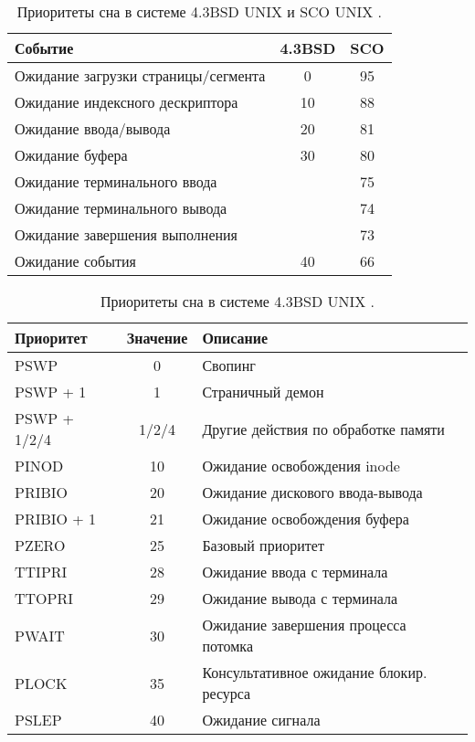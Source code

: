 \begin{table}[h]
	\begin{center}
		\captionsetup{justification=raggedright,singlelinecheck=off}
		\caption{\label{tbl:best2}Приоритеты сна в системе 4.3BSD UNIX и SCO UNIX \cite{unixR}.}
		\begin{tabular}{lcc}
			\hline
			\textbf{Событие} & \textbf{4.3BSD} & \textbf{SCO} \\
                \hline
			Ожидание загрузки страницы/сегмента & 0 & 95 \\
		      Ожидание индексного дескриптора & 10 & 88 \\
                Ожидание ввода/вывода  & 20 & 81 \\
                Ожидание буфера         & 30 & 80 \\
                Ожидание терминального ввода &  & 75 \\
                Ожидание терминального вывода  &  & 74 \\
                Ожидание завершения выполнения &  & 73 \\
                Ожидание события & 40 & 66 \\
			\hline
		\end{tabular}
	\end{center}
\end{table}

\begin{table}[h]
	\begin{center}
		\captionsetup{justification=raggedright,singlelinecheck=off}
		\caption{\label{tbl:best1}Приоритеты сна в системе 4.3BSD UNIX \cite{unix6}.}
		\begin{tabular}{lcl}
			\hline
			\textbf{Приоритет} & \textbf{Значение} & \textbf{Описание} \\
                \hline
			PSWP          & 0     & Свопинг \\
		      PSWP + 1      & 1     & Страничный демон \\
                PSWP + 1/2/4  & 1/2/4 & Другие действия по обработке памяти \\
                PINOD         & 10    & Ожидание освобождения inode \\
                PRIBIO        & 20    & Ожидание дискового ввода-вывода \\
                PRIBIO + 1    & 21    & Ожидание освобождения буфера \\
                PZERO         & 25    & Базовый приоритет \\
                TTIPRI        & 28    & Ожидание ввода с терминала \\
                TTOPRI        & 29    & Ожидание вывода с терминала \\
                PWAIT         & 30    & Ожидание завершения процесса потомка \\
                PLOCK         & 35    & Консультативное ожидание блокир. ресурса \\
                PSLEP         & 40    & Ожидание сигнала \\
			\hline
		\end{tabular}
	\end{center}
\end{table}



